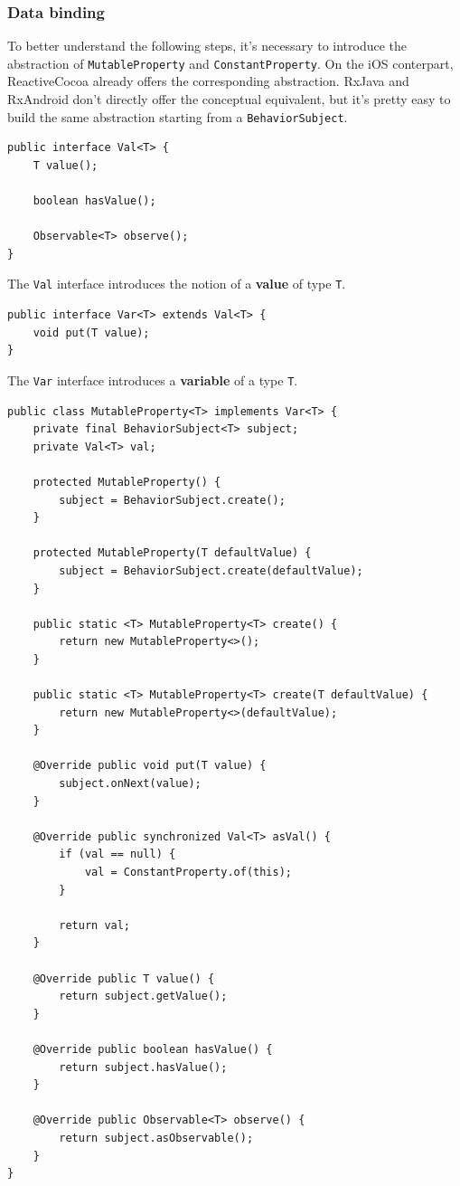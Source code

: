 \subsubsection{Data binding}\label{data-binding}

To better understand the following steps, it's necessary to introduce
the abstraction of \texttt{MutableProperty} and
\texttt{ConstantProperty}. On the iOS conterpart, ReactiveCocoa already
offers the corresponding abstraction. RxJava and RxAndroid don't
directly offer the conceptual equivalent, but it's pretty easy to build
the same abstraction starting from a \texttt{BehaviorSubject}.

\begin{verbatim}
public interface Val<T> {
    T value();

    boolean hasValue();

    Observable<T> observe();
}
\end{verbatim}

The \texttt{Val} interface introduces the notion of a \textbf{value} of
type \texttt{T}.

\begin{verbatim}
public interface Var<T> extends Val<T> {
    void put(T value);
}
\end{verbatim}

The \texttt{Var} interface introduces a \textbf{variable} of a type
\texttt{T}.

\begin{verbatim}
public class MutableProperty<T> implements Var<T> {
    private final BehaviorSubject<T> subject;
    private Val<T> val;

    protected MutableProperty() {
        subject = BehaviorSubject.create();
    }

    protected MutableProperty(T defaultValue) {
        subject = BehaviorSubject.create(defaultValue);
    }

    public static <T> MutableProperty<T> create() {
        return new MutableProperty<>();
    }

    public static <T> MutableProperty<T> create(T defaultValue) {
        return new MutableProperty<>(defaultValue);
    }

    @Override public void put(T value) {
        subject.onNext(value);
    }

    @Override public synchronized Val<T> asVal() {
        if (val == null) {
            val = ConstantProperty.of(this);
        }

        return val;
    }

    @Override public T value() {
        return subject.getValue();
    }

    @Override public boolean hasValue() {
        return subject.hasValue();
    }

    @Override public Observable<T> observe() {
        return subject.asObservable();
    }
}
\end{verbatim}

